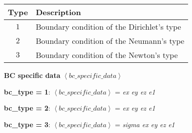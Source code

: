 \documentclass[a4paper]{article}
\begin{document}
\begin{table}[ht]

		\begin{tabular}{||c|l||}
				\hline
				Type				&	Description\\\hline\hline
				$1$					&	Boundary condition of the Dirichlet's type\\\hline
				$2$					&	Boundary condition of the Neumann's type\\\hline
		  	$3$					&	Boundary condition of the Newton's type\\\hline
		\end{tabular}
\end{table}


\begin{flushleft}
\textbf{BC specific data} $\left\langle bc\_specific\_data\right\rangle$
\end{flushleft}

\textbf{bc\_type = 1}: \quad
 $\left\langle bc\_specific\_data\right\rangle$ = \textit{ex ey ez e1}

\textbf{bc\_type = 2}: \quad
 $\left\langle bc\_specific\_data\right\rangle$ = \textit{ex ey ez e1}

\textbf{bc\_type = 3}: \quad
 $\left\langle bc\_specific\_data\right\rangle$ = \textit{sigma ex ey ez e1}
\end{document}
